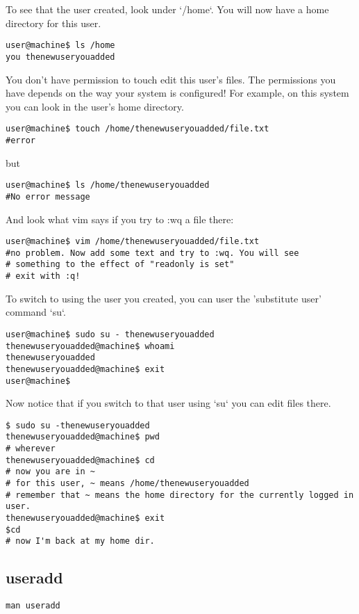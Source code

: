 \documentclass[10pt]{article}
\begin{document}
To see that the user created, look under `/home`. You will now have a home directory for this user.

\begin{lstlisting}[style=term]
user@machine$ ls /home
you thenewuseryouadded
\end{lstlisting}

You don't have permission to touch edit this user's files. The permissions you have depends on the way your system is configured! For example, on
this system you can look in the user's home directory.

\begin{lstlisting}[style=term]
user@machine$ touch /home/thenewuseryouadded/file.txt
#error
\end{lstlisting}


but

\begin{lstlisting}[style=term]
user@machine$ ls /home/thenewuseryouadded
#No error message
\end{lstlisting}

And look what vim says if you try to :wq a file there:

\begin{lstlisting}[style=term]
user@machine$ vim /home/thenewuseryouadded/file.txt
#no problem. Now add some text and try to :wq. You will see
# something to the effect of "readonly is set"
# exit with :q!
\end{lstlisting}

To switch to using the user you created, you can user the 'substitute user' command `su`.

\begin{lstlisting}[style=term]
user@machine$ sudo su - thenewuseryouadded
thenewuseryouadded@machine$ whoami
thenewuseryouadded
thenewuseryouadded@machine$ exit
user@machine$
\end{lstlisting}

Now notice that if you switch to that user using `su` you can edit files there.

\begin{lstlisting}[style=term]
$ sudo su -thenewuseryouadded
thenewuseryouadded@machine$ pwd
# wherever
thenewuseryouadded@machine$ cd
# now you are in ~
# for this user, ~ means /home/thenewuseryouadded
# remember that ~ means the home directory for the currently logged in user.
thenewuseryouadded@machine$ exit
$cd
# now I'm back at my home dir.
\end{lstlisting}

\subsection{useradd}
\begin{lstlisting}[style=term]
man useradd
\end{lstlisting}
\end{document}
